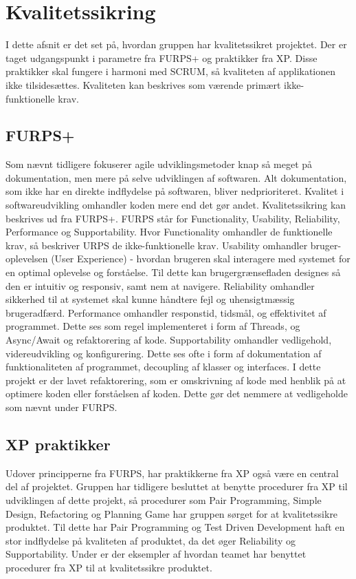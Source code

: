 \chapter{Kvalitetssikring}\label{ch:Kvalitetssikring}

I dette afsnit er det set på, hvordan gruppen har kvalitetssikret projektet. Der er taget udgangspunkt i parametre fra FURPS+ og praktikker fra XP. Disse praktikker skal fungere i harmoni med SCRUM, så kvaliteten af applikationen ikke tilsidesættes. Kvaliteten kan beskrives som værende primært ikke-funktionelle krav.

\section{FURPS+}

Som nævnt tidligere fokuserer agile udviklingsmetoder knap så meget på dokumentation, men mere på selve udviklingen af softwaren. Alt dokumentation, som ikke har en direkte indflydelse på softwaren, bliver nedprioriteret. Kvalitet i softwareudvikling omhandler koden mere end det gør andet. Kvalitetssikring kan beskrives ud fra FURPS+\cite{furps}. FURPS står for Functionality, Usability, Reliability, Performance og Supportability. Hvor Functionality omhandler de funktionelle krav, så beskriver URPS de ikke-funktionelle krav. 
Usability omhandler bruger-oplevelsen (User Experience) - hvordan brugeren skal interagere med systemet for en optimal oplevelse og forståelse. Til dette kan brugergrænsefladen designes så den er intuitiv og responsiv, samt nem at navigere. 
Reliability omhandler sikkerhed til at systemet skal kunne håndtere fejl og uhensigtmæssig brugeradfærd.
Performance omhandler responstid, tidsmål, og effektivitet af programmet. Dette ses som regel implementeret i form af Threads, og Async/Await og refaktorering af kode.
Supportability omhandler vedligehold, videreudvikling og konfigurering. Dette ses ofte i form af dokumentation af funktionaliteten af programmet, decoupling af klasser og interfaces.
I dette projekt er der lavet refaktorering, som er omskrivning af kode med henblik på at optimere koden eller forståelsen af koden. Dette gør det nemmere at vedligeholde som nævnt under FURPS. 

\section{XP praktikker}
Udover principperne fra FURPS, har praktikkerne fra XP også være en central del af projektet. Gruppen har tidligere besluttet at benytte procedurer fra XP til udviklingen af dette projekt, så procedurer som Pair Programming, Simple Design, Refactoring og Planning Game har gruppen sørget for at kvalitetssikre produktet. Til dette har Pair Programming og Test Driven Development\cite{Sommerville} haft en stor indflydelse på kvaliteten af produktet, da det øger Reliability og Supportability.
Under er der eksempler af hvordan teamet har benyttet procedurer fra XP til at kvalitetssikre produktet. 

